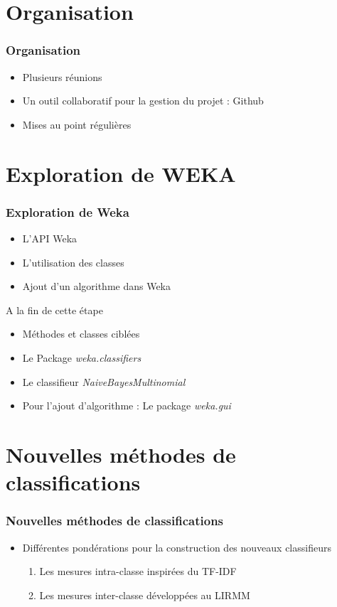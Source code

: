 \documentclass[12pt]{beamer}
\begin{document}
\section{Organisation}
\begin{frame}
\frametitle{Organisation}
\begin{itemize}
	\item Plusieurs réunions
	\item Un outil collaboratif pour la gestion du projet : Github
	\item Mises au point régulières
\end{itemize}
\end{frame}

\section{Exploration de WEKA}

\begin{frame}
\frametitle{Exploration de Weka}
\begin{itemize}
\item L'API Weka
\item L'utilisation des classes
\item Ajout d'un algorithme dans Weka
\end{itemize}
\begin{block}{A la fin de cette étape}
\begin{itemize}
\item Méthodes et classes ciblées
\item Le Package \textit{weka.classifiers}
\item Le classifieur \textit{NaiveBayesMultinomial}
\item Pour l'ajout d'algorithme : Le package \textit{weka.gui}
\end{itemize}
\end{block}
\end{frame}

\section{Nouvelles méthodes de classifications}

\begin{frame}
\frametitle{Nouvelles méthodes de classifications}
\begin{itemize}
\item Différentes pondérations pour la construction des nouveaux classifieurs
\begin{enumerate}
\item Les mesures intra-classe inspirées du TF-IDF
\item Les mesures inter-classe développées au LIRMM
\end{enumerate}
\end{itemize}
\end{frame}
\end{document}
